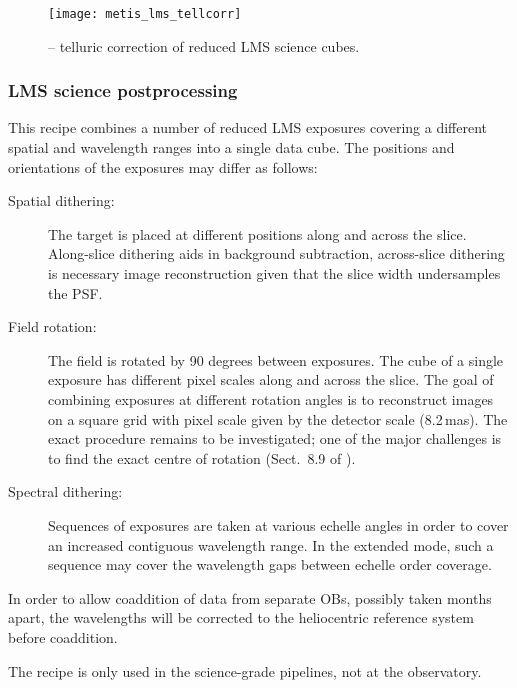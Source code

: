 \begin{figure}[hb]
  \centering
  \texttt{[image: metis\_lms\_tellcorr]}
  \caption[Recipe: ]{
    -- telluric correction of reduced LMS science cubes.}
  \label{fig:metis_lms_tellcorr}
\end{figure}


\clearpage
\subsubsection{LMS science postprocessing}
\label{sssec:lms_sci_postprocess}

This recipe combines a number of reduced LMS exposures covering a
different spatial and wavelength ranges into a single data cube. The
positions and orientations of the exposures may differ as follows:
\begin{description}
\item[Spatial dithering:] The target is placed at different positions
  along and across the slice. Along-slice dithering aids in background
  subtraction, across-slice dithering is necessary image
  reconstruction given that the slice width undersamples the PSF.
\item[Field rotation:] The field is rotated by 90 degrees between
  exposures. The cube of a single exposure has different pixel scales
  along and across the slice. The goal of combining exposures at
  different rotation angles is to reconstruct images on a square grid
  with pixel scale given by the detector scale (8.2\,mas). The exact
  procedure remains to be investigated; one of the major challenges is
  to find the exact centre of rotation
  (Sect.~8.9 of \cite{DRLS}).
\item[Spectral dithering:] Sequences of exposures are taken at various
  echelle angles in order to cover an increased contiguous wavelength
  range. In the extended mode, such a sequence may cover the
  wavelength gaps between echelle order coverage.
\end{description}

In order to allow coaddition of data from separate OBs, possibly taken
months apart, the wavelengths will be corrected to the heliocentric
reference system before coaddition.

The recipe is only used in the science-grade pipelines, not at the
observatory.

